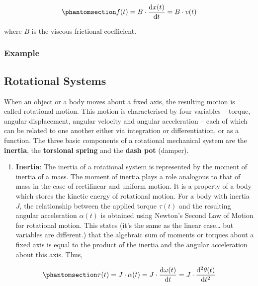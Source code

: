 \documentclass[
  14pt,
  a4paper,
  oneside,
  open=any,
  a4paper,
  14pt]{report}
\providecommand{\tightlist}{%
  \setlength{\itemsep}{0pt}\setlength{\parskip}{0pt}}\usepackage{longtable,booktabs,array}
\begin{document}
\begin{equation}\phantomsection\label{eq-mechsys-damper}{
    f(t) = B\cdot \odv{x(t)}{t} = B\cdot v(t)
}\end{equation}

where \(B\) is the viscous frictional coefficient.

\subsubsection{Example}\label{example}

\subsection{Rotational Systems}\label{rotational-systems}

When an object or a body moves about a fixed axis, the resulting motion
is called rotational motion. This motion is characterised by four
variables -- torque, angular displacement, angular velocity and angular
acceleration -- each of which can be related to one another either via
integration or differentiation, or as a function. The three basic
components of a rotational mechanical system are the \textbf{inertia},
the \textbf{torsional spring} and the \textbf{dash pot} (damper).

\begin{enumerate}
\def\labelenumi{\arabic{enumi}.}
\tightlist
\item
  \textbf{Inertia}: The inertia of a rotational system is represented by
  the moment of inertia of a mass. The moment of inertia plays a role
  analogous to that of mass in the case of rectilinear and uniform
  motion. It is a property of a body which stores the kinetic energy of
  rotational motion. For a body with inertia \(J\), the relationship
  between the applied torque \(\tau(t)\) and the resulting angular
  acceleration \(\alpha(t)\) is obtained using Newton's Second Law of
  Motion for rotational motion. This states (it's the same as the linear
  case\ldots{} but variables are different.) that the algebraic sum of
  moments or torques about a fixed axis is equal to the product of the
  inertia and the angular acceleration about this axis. Thus,
\end{enumerate}

\begin{equation}\phantomsection\label{eq-mechsys-inertia}{
    \tau(t) = J\cdot \alpha(t) = J\cdot \odv{\omega(t)}{t} = J\cdot \odv[2]{\theta(t)}{t}
}\end{equation}
\end{document}
